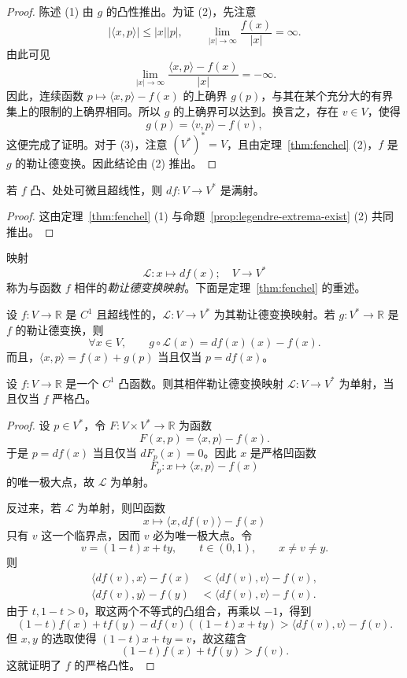 \begin{proof}
陈述 (1) 由 $g$ 的凸性推出。为证 (2)，先注意
\[
  |\langle x,p\rangle|\leq |x||p|,
  \qquad \lim_{|x|\to\infty}\frac{f(x)}{|x|}=\infty.
\]
由此可见
\[
  \lim_{|x|\to\infty}\frac{\langle x,p\rangle-f(x)}{|x|}=-\infty.
\]
因此，连续函数 $p\longmapsto\langle x,p\rangle-f(x)$ 的上确界 $g(p)$，与其在某个充分大的有界集上的限制的上确界相同。所以 $g$ 的上确界可以达到。换言之，存在 $v\in V$，使得
\[
  g(p)=\langle v,p\rangle-f(v),
\]
这便完成了证明。对于 (3)，注意 $(V^*)^*=V$，且由定理~\ref{thm:fenchel} (2)，$f$ 是 $g$ 的勒让德变换。因此结论由 (2) 推出。
\end{proof}

\begin{corollary}[满射性]
\label{cor:legendre-map-surjective}
若 $f$ 凸、处处可微且超线性，则 $df:V\to V^*$ 是满射。
\end{corollary}

\begin{proof}
这由定理~\ref{thm:fenchel} (1) 与命题~\ref{prop:legendre-extrema-exist} (2) 共同推出。
\end{proof}

映射
\[
  \mathcal L:x\longmapsto df(x);\quad V\to V^*
\]
称为与函数 $f$ 相伴的\emph{勒让德变换映射}。下面是定理~\ref{thm:fenchel} 的重述。

\begin{proposition}
\label{prop:legendre-map-identity}
设 $f:V\to\mathbb R$ 是 $C^1$ 且超线性的，$\mathcal L:V\to V^*$ 为其勒让德变换映射。若 $g:V^*\to\mathbb R$ 是 $f$ 的勒让德变换，则
\begin{equation}\label{eq:legendre-map-identity}
  \forall x\in V,\qquad g\circ\mathcal L(x)=df(x)(x)-f(x).
\end{equation}
而且，$\langle x,p\rangle=f(x)+g(p)$ 当且仅当 $p=df(x)$。
\end{proposition}

\begin{theorem}[单射性]
\label{thm:legendre-map-injective}
设 $f:V\to\mathbb R$ 是一个 $C^1$ 凸函数。则其相伴勒让德变换映射 $\mathcal L:V\to V^*$ 为单射，当且仅当 $f$ 严格凸。
\end{theorem}

\begin{proof}
设 $p\in V^*$，令 $F:V\times V^*\to\mathbb R$ 为函数
\[
  F(x,p)=\langle x,p\rangle-f(x).
\]
于是 $p=df(x)$ 当且仅当 $dF_p(x)=0$。因此 $x$ 是严格凹函数
\[
  F_p:x\longmapsto\langle x,p\rangle-f(x)
\]
的唯一极大点，故 $\mathcal L$ 为单射。

反过来，若 $\mathcal L$ 为单射，则凹函数
\[
  x\longmapsto\langle x,df(v)\rangle-f(x)
\]
只有 $v$ 这一个临界点，因而 $v$ 必为唯一极大点。令
\[
  v=(1-t)x+ty,
  \qquad t\in(0,1),\qquad x\neq v\neq y.
\]
则
\begin{align*}
  \langle df(v),x\rangle-f(x)&<\langle df(v),v\rangle-f(v),\\
  \langle df(v),y\rangle-f(y)&<\langle df(v),v\rangle-f(v).
\end{align*}
由于 $t,1-t>0$，取这两个不等式的凸组合，再乘以 $-1$，得到
\[
  (1-t)f(x)+tf(y)-df(v)((1-t)x+ty)
  >\langle df(v),v\rangle-f(v).
\]
但 $x,y$ 的选取使得 $(1-t)x+ty=v$，故这蕴含
\[
  (1-t)f(x)+tf(y)>f(v).
\]
这就证明了 $f$ 的严格凸性。
\end{proof}

